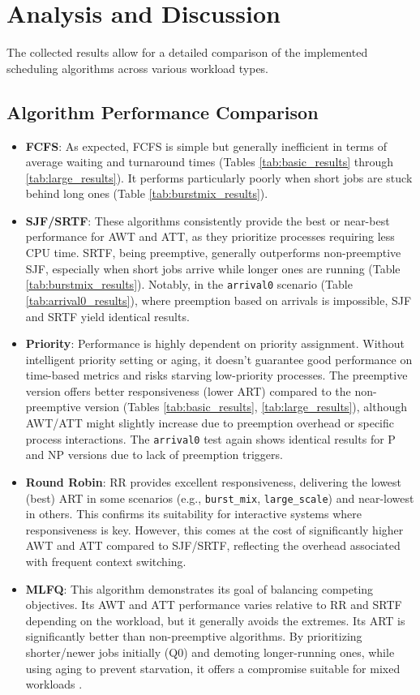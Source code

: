\documentclass[12pt]{article}
\begin{document}
\section{Analysis and Discussion}
The collected results allow for a detailed comparison of the implemented scheduling algorithms across various workload types.

\subsection{Algorithm Performance Comparison}
\begin{itemize}
    \item \textbf{FCFS}: As expected, FCFS is simple but generally inefficient in terms of average waiting and turnaround times (Tables \ref{tab:basic_results} through \ref{tab:large_results}). It performs particularly poorly when short jobs are stuck behind long ones (Table \ref{tab:burstmix_results}).
    \item \textbf{SJF/SRTF}: These algorithms consistently provide the best or near-best performance for AWT and ATT, as they prioritize processes requiring less CPU time. SRTF, being preemptive, generally outperforms non-preemptive SJF, especially when short jobs arrive while longer ones are running (Table \ref{tab:burstmix_results}). Notably, in the \texttt{arrival0} scenario (Table \ref{tab:arrival0_results}), where preemption based on arrivals is impossible, SJF and SRTF yield identical results.
    \item \textbf{Priority}: Performance is highly dependent on priority assignment. Without intelligent priority setting or aging, it doesn't guarantee good performance on time-based metrics and risks starving low-priority processes. The preemptive version offers better responsiveness (lower ART) compared to the non-preemptive version (Tables \ref{tab:basic_results}, \ref{tab:large_results}), although AWT/ATT might slightly increase due to preemption overhead or specific process interactions. The \texttt{arrival0} test again shows identical results for P and NP versions due to lack of preemption triggers.
    \item \textbf{Round Robin}: RR provides excellent responsiveness, delivering the lowest (best) ART in some scenarios (e.g., \texttt{burst\_mix}, \texttt{large\_scale}) and near-lowest in others. This confirms its suitability for interactive systems where responsiveness is key. However, this comes at the cost of significantly higher AWT and ATT compared to SJF/SRTF, reflecting the overhead associated with frequent context switching.
    \item \textbf{MLFQ}: This algorithm demonstrates its goal of balancing competing objectives. Its AWT and ATT performance varies relative to RR and SRTF depending on the workload, but it generally avoids the extremes. Its ART is significantly better than non-preemptive algorithms. By prioritizing shorter/newer jobs initially (Q0) and demoting longer-running ones, while using aging to prevent starvation, it offers a compromise suitable for mixed workloads \citep{nauer}.
\end{itemize}
\end{document}
